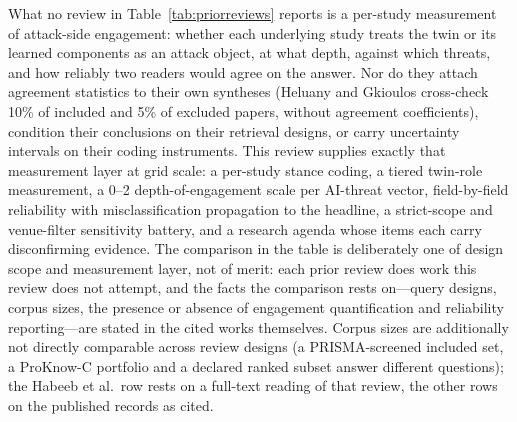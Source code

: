 \documentclass[preprint,12pt]{elsarticle}
\renewcommand{\_}{\plainunderscore\allowbreak}
\begin{document}
What no review in Table~\ref{tab:priorreviews} reports is a per-study measurement of
attack-side engagement: whether each underlying study treats the twin or its learned
components as an attack object, at what depth, against which threats, and how reliably
two readers would agree on the answer. Nor do they attach agreement statistics to
their own syntheses (Heluany and Gkioulos cross-check 10\% of included and 5\% of
excluded papers, without agreement coefficients), condition their conclusions on their
retrieval designs, or carry uncertainty intervals on their coding instruments. This
review supplies exactly that measurement layer at grid scale: a per-study stance
coding, a tiered twin-role measurement, a 0--2 depth-of-engagement scale per AI-threat
vector, field-by-field reliability with misclassification propagation to the headline,
a strict-scope and venue-filter sensitivity battery, and a research agenda whose items
each carry disconfirming evidence. The comparison in the table is deliberately one of
design scope and measurement layer, not of merit: each prior review does work this
review does not attempt, and the facts the comparison rests on---query designs, corpus
sizes, the presence or absence of engagement quantification and reliability
reporting---are stated in the cited works themselves. Corpus sizes are additionally not
directly comparable across review designs (a PRISMA-screened included set, a
ProKnow-C portfolio and a declared ranked subset answer different questions); the
Habeeb et al.\ row rests on a full-text reading of that review, the other rows on the
published records as cited.
\end{document}
